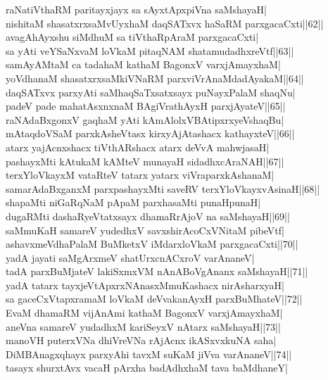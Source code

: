 \documentclass{article}
\begin{document}
raNatiVthaRM paritayxjayx sa sAyxtApxpiVna saMshayaH|\\
nishitaM shasatxrxsaMvUyxhaM daqSATxvx haSaRM parxgacaCxti||62||\\
avagAhAyxshu siMdhuM sa tiVthaRpAraM parxgacaCxti|\\
sa yAti veYSaNxvaM loVkaM pitaqNAM shatamudadhxreVtf||63||\\
samAyAMtaM ca tadahaM kathaM BagonxV varxjAmayxhaM|\\
yoVdhanaM shasatxrxsaMkiVNaRM parxviVrAnaMdadAyakaM||64||\\
daqSATxvx parxyAti saMhaqSaTxsatxsayx puNayxPalaM shaqNu|\\
padeV pade mahatAsxnxnaM BAgiVrathAyxH parxjAyateV||65||\\
raNAdaBxgonxV gaqhaM yAti kAmAlolxVBAtipxrxyeVshaqBu|\\
mAtaqdoVSaM parxkAsheVtasx kirxyAjAtashacx kathayxteV||66||\\
atarx yajAcnxshacx tiVthARshacx atarx deVvA mahwjasaH|\\
pashayxMti kAtukaM kAMteV munayaH sidadhxcAraNAH||67||\\
terxYloVkayxM vataRteV tatarx yatarx viVraparxkAshanaM|\\
samarAdaBxganxM parxpashayxMti saveRV terxYloVkayxvAsinaH||68||\\
shapaMti niGaRqNaM pApaM parxhasaMti punaHpunaH|\\
dugaRMti dashaRyeVtatxsayx dhamaRrAjoV na saMshayaH||69||\\
saMmuKaH samareV yudedhxV savxshirAcoCxVNitaM pibeVtf|\\
ashavxmeVdhaPalaM BuMketxV iMdarxloVkaM parxgacaCxti||70||\\
yadA jayati saMgArxmeV shatUrxcnACxroV varAnaneV|\\
tadA parxBuMjateV lakiSxmxVM nAnABoVgAnanx saMshayaH||71||\\
yadA tatarx tayxjeVtApxrxNAnasxMmuKashacx nirAsharxyaH|\\
sa gaceCxVtapxramaM loVkaM deVvakanAyxH parxBuMhateV||72||\\
EvaM dhamaRM vijAnAmi kathaM BagonxV varxjAmayxhaM|\\
aneVna samareV yudadhxM kariSeyxV nAtarx saMshayaH||73||\\
manoVH puterxVNa dhiVreVNa rAjAcnx ikASxvxkuNA saha|\\
DiMBAnagxqhayx parxyAhi tavxM suKaM jiVva varAnaneV||74||\\
tasayx shurxtAvx vacaH pArxha badAdhxhaM tava baMdhaneY|\\
\end{document}
